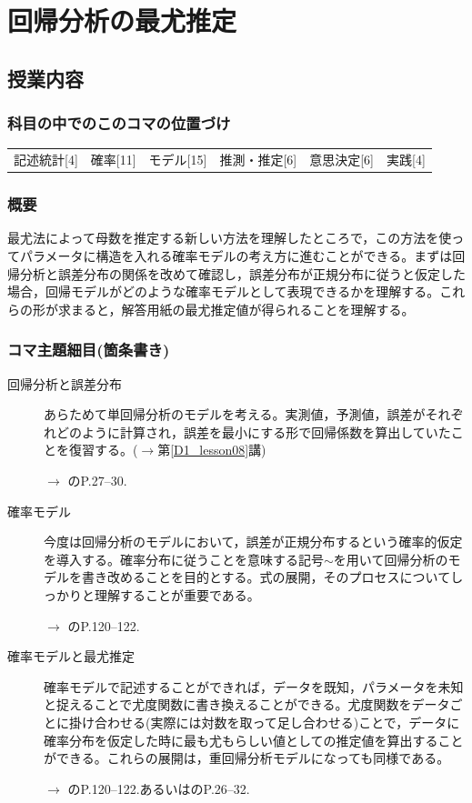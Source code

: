\section{回帰分析の最尤推定}
\label{D1_lesson24}

\subsection{授業内容}
\subsubsection{科目の中でのこのコマの位置づけ}
\begin{tabular}[t]{cccccc}
    記述統計[4] & 確率[11] & モデル[15] & 推測・推定[6] & 意思決定[6] & 実践[4]
\end{tabular}

\subsubsection{概要}
最尤法によって母数を推定する新しい方法を理解したところで，この方法を使ってパラメータに構造を入れる確率モデルの考え方に進むことができる。まずは回帰分析と誤差分布の関係を改めて確認し，誤差分布が正規分布に従うと仮定した場合，回帰モデルがどのような確率モデルとして表現できるかを理解する。これらの形が求まると，解答用紙の最尤推定値が得られることを理解する。
\subsubsection{コマ主題細目(箇条書き)}
\begin{description}

\item[回帰分析と誤差分布]あらためて単回帰分析のモデルを考える。実測値，予測値，誤差がそれぞれどのように計算され，誤差を最小にする形で回帰係数を算出していたことを復習する。($\to$第\ref{D1_lesson08}講)
\begin{flushright}
    $\to$ \citet{豊田201706}のP.27--30.
\end{flushright}

\item[確率モデル]今度は回帰分析のモデルにおいて，誤差が正規分布するという確率的仮定を導入する。確率分布に従うことを意味する記号$\sim$を用いて回帰分析のモデルを書き改めることを目的とする。式の展開，そのプロセスについてしっかりと理解することが重要である。
\begin{flushright}
    $\to$ \citet{kosugi2018}のP.120--122.
\end{flushright}

\item[確率モデルと最尤推定]確率モデルで記述することができれば，データを既知，パラメータを未知と捉えることで尤度関数に書き換えることができる。尤度関数をデータごとに掛け合わせる(実際には対数を取って足し合わせる)ことで，データに確率分布を仮定した時に最も尤もらしい値としての推定値を算出することができる。これらの展開は，重回帰分析モデルになっても同様である。
\begin{flushright}
    $\to$ \citet{kosugi2018}のP.120--122.あるいは\citet{浜田201912}のP.26--32.
\end{flushright}

\end{description}
